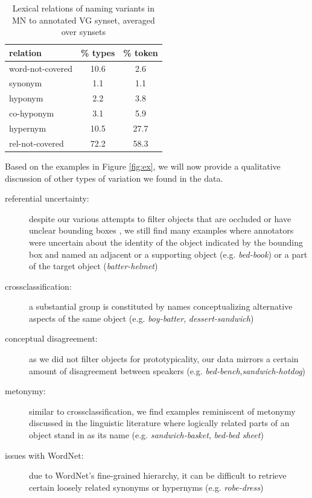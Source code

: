 \begin{table}
\small
\centering
\begin{tabular}{lcc}
\toprule
         relation & \% types & \% token \\
\midrule
 word-not-covered &  10.6 &  2.6 \\
\midrule
 synonym &  1.1 &  1.1 \\
 hyponym &  2.2 &  3.8 \\
 co-hyponym &  3.1 &  5.9 \\
 hypernym &  10.5 &  27.7 \\
 rel-not-covered &  72.2 &  58.3 \\
\bottomrule
\end{tabular}
\caption{Lexical relations of naming variants in MN to annotated VG synset, averaged over synsets}
\label{tab:rel}
\end{table}

Based on the examples in Figure \ref{fig:ex}, we will now provide a qualitative discussion of other types of variation we found in the data.

\begin{description}
\item[referential uncertainty:] despite our various attempts to filter objects that are occluded or have unclear bounding boxes , we still find many examples where annotators were uncertain about the identity of the object indicated by the bounding box and named an adjacent or a supporting object (e.g. \textit{bed-book}) or a part of the target object (\textit{batter-helmet})
\item[crossclassification:] a substantial group is constituted by names conceptualizing alternative aspects of the same object (e.g. \textit{boy-batter}, \textit{dessert-sandwich})
\item[conceptual disagreement:] as we did not filter objects for prototypicality, our data mirrors a certain amount of disagreement between speakers (e.g. \textit{bed-bench},\textit{sandwich-hotdog})
\item[metonymy:] similar to crossclassification, we find examples reminiscent of metonymy discussed in the linguistic literature \cite{pustejovsky1991generative} where logically related parts of an object stand in as its name (e.g.  \textit{sandwich-basket}, \textit{bed-bed sheet})
\item[issues with WordNet:] due to WordNet's fine-grained hierarchy, it can be difficult to retrieve certain loosely related synonyms or hypernyms (e.g. \textit{robe-dress})
\end{description}


